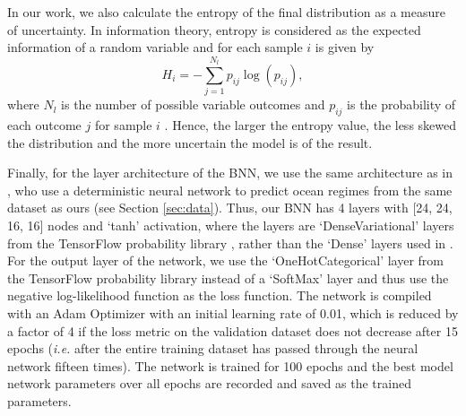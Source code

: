\documentclass[a4paper]{article}
\begin{document}
In our work, we also calculate the entropy of the final distribution as a measure of uncertainty. In information theory, entropy is considered as the expected information of a random variable and for each sample $i$ is given by
\begin{equation}\label{eq:entropy}
    H_{i} = - \sum_{j=1}^{N_{l}} p_{ij}\log(p_{ij}),
\end{equation}
where $N_{l}$ is the number of possible variable outcomes and $p_{ij}$ is the probability of each outcome $j$ for sample $i$ \citep{Goodfellow-et-al-2016}. Hence, the larger the entropy value, the less skewed the distribution and the more uncertain the model is of the result. 

Finally, for the layer architecture of the BNN, we use the same architecture as in \cite{THOR}, who use a deterministic neural network to predict ocean regimes from the same dataset as ours (see Section \ref{sec:data}). Thus, our BNN has 4 layers with [24, 24, 16, 16] nodes and `tanh' activation, where the layers are `DenseVariational' layers from the TensorFlow probability library \citep{dillon2017tensorflow}, rather than the `Dense' layers used in \cite{THOR}. For the output layer of the network, we use the `OneHotCategorical' layer from the TensorFlow probability library instead of a `SoftMax' layer and thus use the negative log-likelihood function as the loss function. The network is compiled with an Adam Optimizer \citep{kingma2014adam} with an initial learning rate of 0.01, which is reduced by a factor of 4 if the loss metric on the validation dataset does not decrease after 15 epochs (\textit{i.e.} after the entire training dataset has passed through the neural network fifteen times). The network is trained for 100 epochs and the best model network parameters over all epochs are recorded and saved as the trained parameters.
\end{document}
